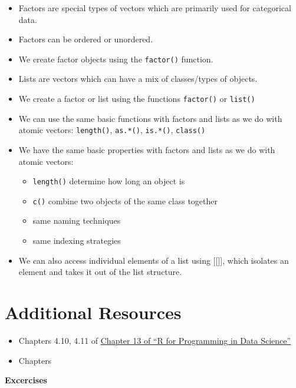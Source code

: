 \documentclass[
]{book}
\providecommand{\tightlist}{%
  \setlength{\itemsep}{0pt}\setlength{\parskip}{0pt}}
\begin{document}
\begin{itemize}
\item
  Factors are special types of vectors which are primarily used for categorical data.
\item
  Factors can be ordered or unordered.
\item
  We create factor objects using the \texttt{factor()} function.
\item
  Lists are vectors which can have a mix of classes/types of objects.
\item
  We create a factor or list using the functions \texttt{factor()} or \texttt{list()}
\item
  We can use the same basic functions with factors and lists as we do with atomic vectors: \texttt{length()}, \texttt{as.*()}, \texttt{is.*()}, \texttt{class()}
\item
  We have the same basic properties with factors and lists as we do with atomic vectors:

  \begin{itemize}
  \item
    \texttt{length()} determine how long an object is
  \item
    \texttt{c()} combine two objects of the same class together
  \item
    same naming techniques
  \item
    same indexing strategies
  \end{itemize}
\item
  We can also access individual elements of a list using {[}{[}{]}{]}, which isolates an element and takes it out of the list structure.
\end{itemize}

\hypertarget{additional-resources-2}{%
\section*{Additional Resources}\label{additional-resources-2}}

\begin{itemize}
\tightlist
\item
  Chapters 4.10, 4.11 of \href{https://bookdown.org/rdpeng/rprogdatascience/}{Chapter 13 of ``R for Programming in Data Science''}
\item
  Chapters
\end{itemize}

\textbf{Excercises}
\end{document}
